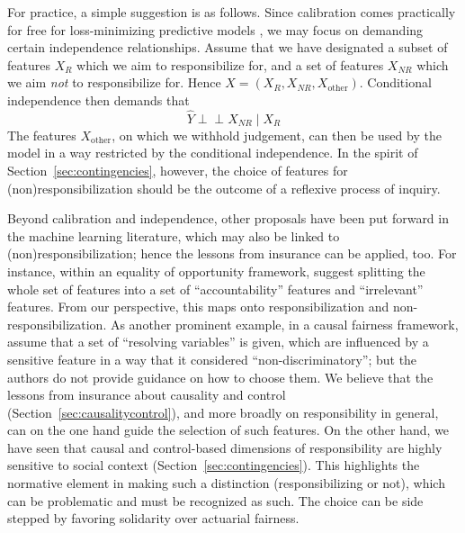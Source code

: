 \documentclass[11pt]{article} %
\newcommand{\indep}{\perp \!\!\! \perp}
\begin{document}
For practice, a simple suggestion is as follows. Since calibration comes practically for free for loss-minimizing predictive models \citep[p.\@\xspace 62f]{barocas-hardt-narayanan}, we may focus on demanding certain independence relationships. Assume that we have designated a subset of features $X_R$ which we aim to responsibilize for, and a set of features $X_{NR}$ which we aim \textit{not} to responsibilize for. Hence $X=(X_R,X_{NR},X_{\text{other}})$. Conditional independence \citep{castelnovo2022clarification} then demands that 
\begin{displaymath}
    \hat{Y} \indep X_{NR} \mid X_R
\end{displaymath}
The features $X_{\text{other}}$, on which we withhold judgement, can then be used by the model in a way restricted by the conditional independence.
In the spirit of Section~\ref{sec:contingencies}, however, the choice of features for (non)responsibilization should be the outcome of a reflexive process of inquiry.

Beyond calibration and independence, other proposals have been put forward in the machine learning literature, which may also be linked to (non)responsibilization; hence the lessons from insurance can be applied, too. For instance, within an equality of opportunity framework, \citet{heidari2019moral} suggest splitting the whole set of features into a set of ``accountability'' features and ``irrelevant'' features. From our perspective, this maps onto responsibilization and non-responsibilization. As another prominent example, in a causal fairness framework, \citet{kilbertus2017avoiding} assume that a set of ``resolving variables'' is given, which are influenced by a sensitive feature in a way that it considered ``non-discriminatory''; but the authors do not provide guidance on how to choose them. 
We believe that the lessons from insurance about causality and control (Section~\ref{sec:causalitycontrol}), and more broadly on responsibility in general, can on the one hand guide the selection of such features. On the other hand, we have seen that causal and control-based dimensions of responsibility are highly sensitive to social context (Section~\ref{sec:contingencies}). This highlights the normative element in making such a distinction (responsibilizing or not), which can be problematic and must be recognized as such. The choice can be side stepped by favoring solidarity over actuarial fairness.
\end{document}
